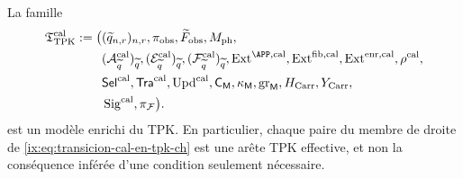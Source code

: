 \begin{proposition}
\label{ix:prop:modelo-tpk-calibrado-ch}
La famille
\[
\begin{aligned}
 \mathfrak T_{\rm TPK}^{\rm cal}:=\bigl(
 &(\widetilde q_{n,r})_{n,r},\pi_{\rm obs},
   \widetilde F_{\rm obs},M_{\rm ph},\\
 &(\mathcal A_{\widetilde q}^{\rm cal})_{\widetilde q},
   (\mathcal E_{\widetilde q}^{\rm cal})_{\widetilde q},
   (\mathcal F_{\widetilde q}^{\rm cal})_{\widetilde q},
   \operatorname{Ext}^{\APP,\rm cal},
   \operatorname{Ext}^{\rm fib,cal},
   \operatorname{Ext}^{\rm enr,cal},\rho^{\rm cal},\\
 &\mathsf{Sel}^{\rm cal},\mathsf{Tra}^{\rm cal},
   \operatorname{Upd}^{\rm cal},\mathsf C_{\mathsf M},
   \kappa_{\mathsf M},\operatorname{gr}_{\mathsf M},
   H_{\rm Carr},Y_{\rm Carr},\\
 &\operatorname{Sig}^{\rm cal},\pi_{\mathcal F}\bigr).
\end{aligned}
\]
est un modèle enrichi du TPK. En particulier, chaque paire du membre de droite de \eqref{ix:eq:transicion-cal-en-tpk-ch} est une arête TPK effective, et non la conséquence inférée d'une condition seulement nécessaire.
\end{proposition}

